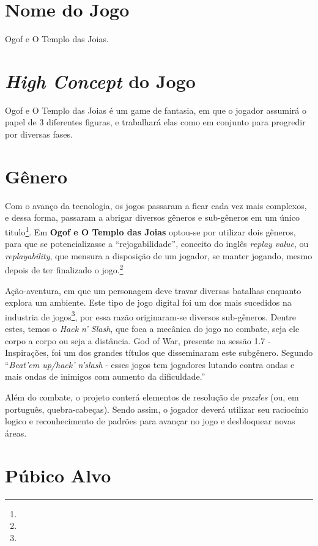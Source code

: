 \section{Nome do Jogo} Ogof e O Templo das Joias.

\section{\textit{High Concept} do Jogo} Ogof e O Templo das Joias é um game de
fantasia, em que o jogador assumirá o papel de 3 diferentes figuras, e trabalhará elas como
em conjunto para progredir por diversas fases.

\section{Gênero}
Com o avanço da tecnologia, os jogos passaram a ficar cada vez mais complexos, e dessa forma, passaram a abrigar diversos gêneros e sub-gêneros em um único titulo\footnote{}. Em \textbf{Ogof e O Templo das Joias} optou-se por utilizar dois gêneros, para que se potencializasse a ``rejogabilidade'', conceito do inglês \textit{replay value}, ou \textit{replayability}, que mensura a disposição de um jogador, se manter jogando, mesmo depois de ter finalizado o jogo.\footnote{}

Ação-aventura, em que um personagem deve travar diversas batalhas enquanto explora um ambiente. Este tipo de jogo digital foi um dos mais sucedidos na industria de jogos\footnote{}, por essa razão originaram-se diversos sub-gêneros. Dentre estes, temos o \textit{Hack n' Slash}, que foca a mecânica do jogo no combate, seja ele corpo a corpo ou seja a distância. God of War, presente  na sessão 1.7 - Inspirações, foi um dos grandes títulos que disseminaram este subgênero. Segundo  ``\textit{Beat'em up/hack' n'slash} - esses jogos tem jogadores lutando contra ondas e mais ondas de inimigos com aumento da dificuldade.''

Além do combate, o projeto conterá elementos de resolução de \textit{puzzles} (ou, em português, quebra-cabeças). Sendo assim, o jogador deverá utilizar seu raciocínio logico e reconhecimento de padrões para avançar no jogo e desbloquear novas áreas.

\section{Púbico Alvo}

